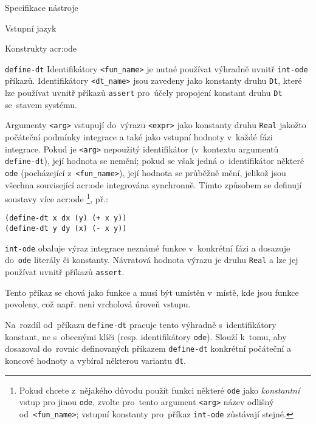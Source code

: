 \documentclass[thesis=M,czech]{FITthesis}[2012/06/26]
\newcommand{\acrlabel}[1]{acr:#1}
\newcommand{\acr}[1]{\acrshort{\acrlabel{#1}}}
\newcommand{\id}[1]{\texttt{#1}}
\newcommand{\hl}[1]{\textit{#1}}
\begin{document}
\begin{section}{Specifikace nástroje}
\begin{subsection}{Vstupní jazyk}
\begin{subsubsection}{Konstrukty \acr{ode}}
\begin{paragraph}{\id{define-dt}}
Identifikátory \id{<fun\_\-name>}
je nutné používat výhradně uvnitř \id{int\--ode} příkazů.
Identifikátory \id{<dt\_\-name>} jsou zavedeny jako konstanty druhu \id{Dt},
které lze používat uvnitř příkazů \id{assert}
pro~účely propojení konstant druhu \id{Dt} se~stavem systému.

Argumenty \id{<arg>} vstupují do~výrazu \id{<expr>}
jako konstanty druhu \id{Real} jakožto počáteční podmínky integrace
a také jako vstupní hodnoty v~každé fázi integrace.
Pokud je \id{<arg>} nepoužitý identifikátor
(v~kontextu argumentů \id{define\--dt}), její hodnota se nemění;
pokud se však jedná o~identifikátor některé \id{ode}
(pocházející z~\id{<fun\_\-name>}),
její hodnota se průběžně mění,
jelikož jsou všechna související \acr{ode} integrována synchronně.
Tímto způsobem se definují soustavy více \acr{ode}%
\footnote{Pokud chcete z~nějakého důvodu
použít funkci některé \id{ode}
jako \hl{konstantní} vstup pro jinou \id{ode},
zvolte pro~tento argument \id{<arg>}
název odlišný od~\id{<fun\_\-name>};
vstupní konstanty pro~příkaz \id{int\--ode} zůstávají stejné.}, př.:
\begin{center}
\id{(define-dt x dx (y) (+ x y))}\\
\id{(define-dt y dy (x) (- x y))}
\end{center}
\end{paragraph} %


\begin{paragraph}{\id{int-ode}}\label{p:design:spec:ilang:ode:int}
obaluje výraz integrace neznámé funkce v~konkrétní fázi
a dosazuje do~\id{ode} literály či konstanty.
Návratová hodnota výrazu je druhu \id{Real} a lze jej používat
uvnitř příkazů \id{assert}.

Tento příkaz se chová jako funkce a musí být umístěn v~místě,
kde jsou funkce povoleny,
což např. není vrcholová úroveň vstupu.

Na~rozdíl od~příkazu \id{define\--dt} pracuje tento
výhradně s~identifikátory konstant, ne s~obecnými klíči
(resp. identifikátory \id{ode}).
Slouží k~tomu, aby dosazoval do~rovnic definovaných
příkazem \id{define\--dt} konkrétní
počáteční a koncové hodnoty
a vybíral některou variantu \id{dt}.


\end{paragraph}
\end{subsubsection}
\end{subsection}
\end{section}
\end{document}
